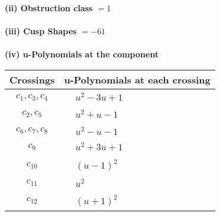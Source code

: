 \documentclass[1p]{elsarticle_modified}
\theoremstyle{definition}
\begin{document}
\flushleft \textbf{(ii) Obstruction class $= 1$}\\~\\
\flushleft \textbf{(iii) Cusp Shapes $= -61$}\\~\\
\newpage\renewcommand{\arraystretch}{1}
\flushleft \textbf{(iv) u-Polynomials at the component}\newline \\
\begin{tabular}{m{50pt}|m{274pt}}
Crossings & \hspace{64pt}u-Polynomials at each crossing \\
\hline $$\begin{aligned}c_{1},c_{3},c_{4}\end{aligned}$$&$\begin{aligned}
&u^2-3 u+1
\end{aligned}$\\
\hline $$\begin{aligned}c_{2},c_{5}\end{aligned}$$&$\begin{aligned}
&u^2+u-1
\end{aligned}$\\
\hline $$\begin{aligned}c_{6},c_{7},c_{8}\end{aligned}$$&$\begin{aligned}
&u^2- u-1
\end{aligned}$\\
\hline $$\begin{aligned}c_{9}\end{aligned}$$&$\begin{aligned}
&u^2+3 u+1
\end{aligned}$\\
\hline $$\begin{aligned}c_{10}\end{aligned}$$&$\begin{aligned}
&(u-1)^2
\end{aligned}$\\
\hline $$\begin{aligned}c_{11}\end{aligned}$$&$\begin{aligned}
&u^2
\end{aligned}$\\
\hline $$\begin{aligned}c_{12}\end{aligned}$$&$\begin{aligned}
&(u+1)^2
\end{aligned}$\\
\hline
\end{tabular}\\~\\
\end{document}
